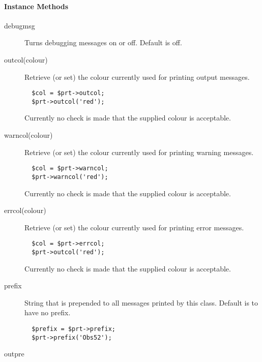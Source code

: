\paragraph*{Instance Methods\label{ORAC::Print_Instance_Methods}}\begin{description}
\item[debugmsg] \mbox{}

Turns debugging messages on or off. Default is off.

\item[outcol(colour)] \mbox{}

Retrieve (or set) the colour currently used for printing output
messages.

\begin{verbatim}
  $col = $prt->outcol;
  $prt->outcol('red');
\end{verbatim}


Currently no check is made that the supplied colour is acceptable.

\item[warncol(colour)] \mbox{}

Retrieve (or set) the colour currently used for printing warning
messages.

\begin{verbatim}
  $col = $prt->warncol;
  $prt->warncol('red');
\end{verbatim}


Currently no check is made that the supplied colour is acceptable.

\item[errcol(colour)] \mbox{}

Retrieve (or set) the colour currently used for printing error
messages.

\begin{verbatim}
  $col = $prt->errcol;
  $prt->outcol('red');
\end{verbatim}


Currently no check is made that the supplied colour is acceptable.

\item[prefix] \mbox{}

String that is prepended to all messages printed by this class.
Default is to have no prefix.

\begin{verbatim}
  $prefix = $prt->prefix;
  $prt->prefix('Obs52');
\end{verbatim}
\item[outpre] \mbox{}


\end{description}
